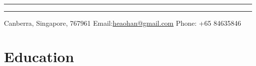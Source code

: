 \documentclass[a4paper,12pt]{article} %
\begin{document}
\pagestyle{empty} %



\par{\bigskip\par} %
\hrule \vskip 0.5mm \hrule
\small{Canberra, Singapore, 767961 \hspace{1.6cm} Email:\href{mailto:heaohan@gmail.com}{heaohan@gmail.com}\hspace{1.6cm}  Phone: +65 84635846}

%


\section{Education}

%
%
\end{document}
